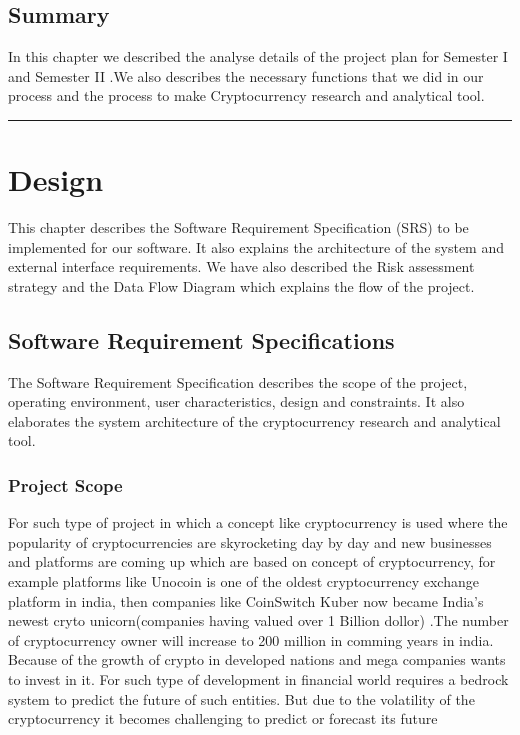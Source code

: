 \documentclass[openany,12pt]{report}
\begin{document}
\section{Summary}
In this chapter we described the analyse details of the project plan for Semester I and Semester II .We also describes the necessary functions that we did in our process and the process to make Cryptocurrency research and analytical tool.
\vfill
\hrule
\chapter{Design}
This chapter describes the Software Requirement Specification (SRS) to be implemented for our software. It also explains the architecture of the system and external interface requirements. We have also described the Risk assessment strategy and the Data Flow Diagram which explains the flow of the project.
\section{Software Requirement Specifications}
The Software Requirement Specification describes the scope of the project, operating environment, user characteristics, design and constraints. It also elaborates the system architecture of the cryptocurrency research and analytical tool.

\subsection{Project Scope}

For such type of project in which a concept like cryptocurrency is used where the popularity of cryptocurrencies are skyrocketing day by day and new businesses and platforms are coming up which are based on concept of cryptocurrency, for example platforms like Unocoin is one of the oldest cryptocurrency exchange platform in india, then companies like CoinSwitch Kuber now became India's newest cryto unicorn(companies having valued over 1 Billion dollor) .The number of cryptocurrency owner will increase to 200 million in comming years in india. Because of the growth of crypto in developed nations and mega companies wants to invest in it.
For such type of development in financial world requires a bedrock system to predict the future of such entities.
But due to the volatility of the cryptocurrency it becomes challenging to predict or forecast its future
\end{document}
